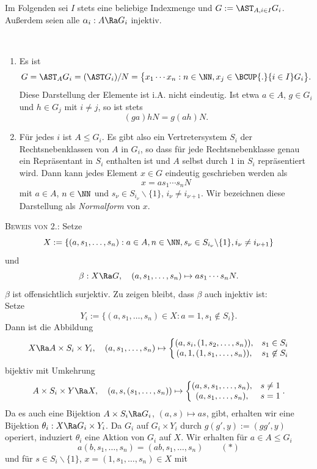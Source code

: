 Im Folgenden sei $I$ stets eine beliebige Indexmenge und
$G:=\AST_{A,i\in I} G_i$. Außerdem seien alle
$\alpha_i:A\Ra G_i$ injektiv.

\DB\
\begin{enumerate}
\item Es ist
\[
G = \AST_A G_i = (\AST G_i)/N
=\bigl\{x_1\cdots x_n : n\in\NN, x_j\in\BCUP{.}{i\in I} G_i \bigr\}.
\]
Diese Darstellung der Elemente ist i.A. nicht eindeutig.
Ist etwa $a\in A$, $g\in G_i$ und $h\in G_j$ mit $i\neq j$, so
ist stets
\[
(ga)hN = g(ah)N.
\]
\item Für jedes $i$ ist $A\leq G_i$. Es gibt also ein Vertretersystem
$S_i$ der Rechtsnebenklassen von $A$ in $G_i$, so
dass für jede Rechtsnebenklasse genau ein Repräsentant
in $S_i$ enthalten ist und $A$ selbst durch $1$ in $S_i$ repräsentiert
wird.
Dann kann jedes Element $x\in G$ eindeutig geschrieben werden
als
\[
x = as_1\cdots s_n N
\]
mit $a\in A$, $n\in\NN$ und $s_{\nu}\in S_{i_{\nu}}\backslash\{1\}$,
$i_{\nu}\neq i_{\nu+1}$.
Wir bezeichnen diese Darstellung als \emph{Normalform} von $x$.
\end{enumerate}
\textsc{Beweis von 2.:}
Setze
\[
X :=
\{ (a,s_1,\ldots,s_n): a\in A, n\in\NN,
s_{\nu}\in S_{i_{\nu}}\backslash\{1\},
i_{\nu}\neq i_{\nu+1} \}
\]
und
\[
\beta:X\Ra G,\quad (a,s_1,\ldots,s_n)\mapsto a s_1\cdots s_n N.
\]
$\beta$ ist offensichtlich surjektiv. Zu zeigen bleibt,
dass $\beta$ auch injektiv ist:\\
Setze
\[
Y_i :=
\{ (a,s_1,\ldots,s_n)\in X : a=1, s_1\not\in S_i \}.
\]
Dann ist die Abbildung
\[
X\Ra A\times S_i\times Y_i,\quad
(a,s_1,\ldots,s_n)\mapsto \left\{
\begin{matrix}
(a,s_i,(1,s_2,\ldots,s_n)), & s_1\in S_i \\
(a,1,(1,s_1,\ldots,s_n)), & s_1\not\in S_i
\end{matrix}
\right.
\]
bijektiv mit Umkehrung
\[
A\times S_i\times Y \Ra X,\quad
(a,s,(s_1,\ldots,s_n))\mapsto \left\{
\begin{matrix}
(a,s,s_1,\ldots,s_n), & s \neq 1 \\
(a,s_1,\ldots,s_n), & s = 1
\end{matrix}
\right..
\]
Da es auch eine Bijektion
$A\times S_i \Ra G_i$, $(a,s)\mapsto as$, gibt,
erhalten wir eine Bijektion
$\theta_i:X\Ra G_i\times Y_i$.
Da $G_i$ auf $G_i\times Y_i$ durch $g(g',y):=(gg',y)$ operiert,
induziert $\theta_i$ eine Aktion von $G_i$ auf $X$.
Wir erhalten für $a\in A\leq G_i$
\[
a(b,s_1,\ldots,s_n) = (ab,s_1,\ldots,s_n)\qquad (*)
\]
und für $s\in S_i\backslash\{1\}$, $x=(1,s_1,\ldots,s_n)\in X$ mit
